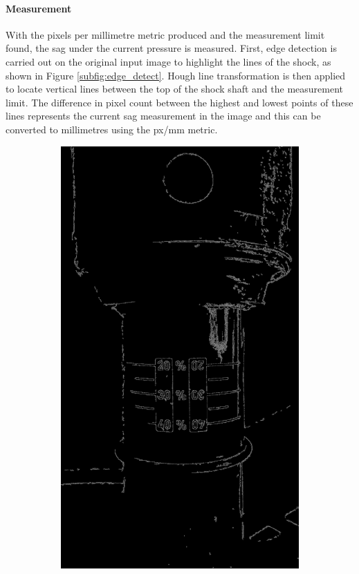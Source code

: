 		\paragraph{Measurement}
			With the pixels per millimetre metric produced and the measurement limit found, the sag under the current pressure is measured. First, edge detection is carried out on the original input image to highlight the lines of the shock, as shown in Figure \ref{subfig:edge_detect}. Hough line transformation is then applied to locate vertical lines between the top of the shock shaft and the measurement limit. The difference in pixel count between the highest and lowest points of these lines represents the current sag measurement in the image and this can be converted to millimetres using the px/mm metric.
			\begin{figure}[h!]
				\centering
				\begin{subfigure}[t]{0.4\textwidth}
					\centering
					\includegraphics[scale=0.04]{../images/results/edged.jpg}

\end{subfigure}
\end{figure}
